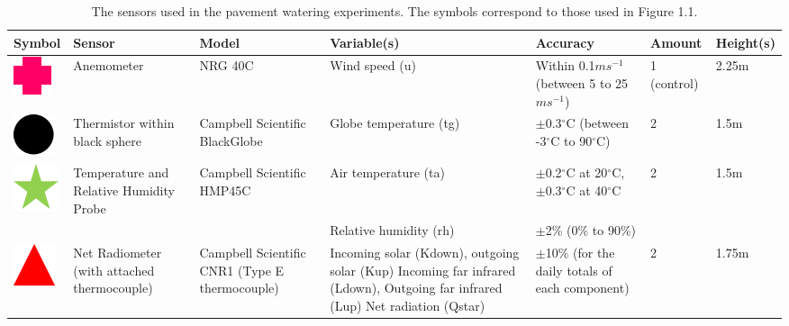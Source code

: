 \documentclass[final,3p,times,authoryear]{elsarticle}
\begin{document}
\begin{table}[!ht]\caption{The sensors used in the pavement watering experiments. The symbols correspond to those used in Figure 1.1.}
    \centering
   \footnotesize 
    \begin{tabular}{|p{0.90cm}|p{2.0cm}|p{2.0cm}|p{3.5cm}|p{2.5cm}|p{1.0cm}|p{1.0cm}|}
    \hline
        Symbol & Sensor & Model & Variable(s) & Accuracy & Amount & Height(s) \\ \hline
        \includegraphics[trim={0 0 0 0},clip,scale=0.5]{Picture1.png}& Anemometer & NRG 40C & Wind speed (\gls{u}) & Within 0.1$ms^{-1}$ (between 5 to 25$ms^{-1}$) & 1 (control) & 2.25m  \\ \hline
        \includegraphics[trim={0 0 0 0},clip,scale=0.5]{Picture2.png}& Thermistor within black sphere & Campbell Scientific BlackGlobe & Globe temperature (\gls{tg}) & $\pm$0.3$^{\circ}$C (between -3$^{\circ}$C to 90$^{\circ}$C) & 2 & 1.5m  \\ \hline

                
\includegraphics[trim={0 0 0 0},clip,scale=0.5]{Picture3.png} &Temperature and Relative Humidity Probe &Campbell Scientific HMP45C&Air temperature (\gls{ta})&$\pm$0.2$^{\circ}$C at 20$^{\circ}$C, $\pm$0.3$^{\circ}$C at 40$^{\circ}$C &2&1.5m \\ 
  &&&Relative humidity (\gls{rh})&$\pm$2\% (0\% to 90\%)&& \\ \hline
  
\includegraphics[trim={0 0 0 0},clip,scale=0.5]{Picture4.png}&Net Radiometer (with attached thermocouple) &Campbell Scientific CNR1 (Type E thermocouple)&Incoming solar (\gls{Kdown}), outgoing solar (\gls{Kup})
Incoming far infrared (\gls{Ldown}),
Outgoing far infrared (\gls{Lup})
Net radiation (\gls{Qstar})&$\pm$10\% (for the daily totals of each component)&2&1.75m \\ 
  \hline 
  

\end{tabular}
\end{table}
\end{document}
